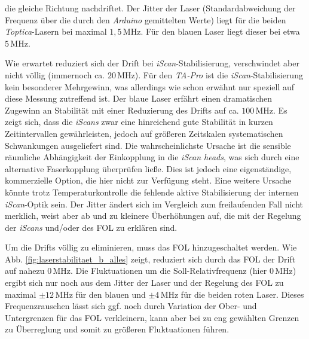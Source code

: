 die gleiche Richtung nachdriftet. Der Jitter der Laser (Standardabweichung der
Frequenz über die durch den \textit{Arduino} gemittelten Werte) liegt für die
beiden \textit{Toptica}-Lasern bei maximal $1,5\,$MHz. Für den blauen Laser
liegt dieser bei etwa $5\,$MHz.\par
Wie erwartet reduziert sich der Drift bei \textit{iScan}-Stabilisierung,
verschwindet aber nicht völlig (immernoch ca. $20\,$MHz). Für den \textit{TA-Pro} ist die
\textit{iScan}-Stabilisierung kein besonderer Mehrgewinn, was allerdings wie
schon erwähnt nur speziell auf diese Messung zutreffend ist. Der blaue Laser
erfährt einen dramatischen Zugewinn an Stabilität mit einer Reduzierung des
Drifts auf ca. $100\,$MHz. Es zeigt sich, dass die \textit{iScans} zwar
eine hinreichend gute Stabilität in kurzen Zeitintervallen gewährleisten, jedoch
auf größeren Zeitskalen systematischen Schwankungen ausgeliefert sind. Die
wahrscheinlichste Ursache ist die sensible räumliche Abhängigkeit der
Einkopplung in die \textit{iScan heads}, was sich durch eine alternative
Faserkopplung überprüfen ließe. Dies ist jedoch eine eigenständige, kommerzielle
Option, die hier nicht zur Verfügung steht. Eine weitere Ursache könnte trotz
Temperaturkontrolle die fehlende aktive Stabilisierung der internen \textit{iScan}-Optik sein. Der Jitter ändert sich im Vergleich zum freilaufenden Fall nicht merklich,
weist aber ab und zu kleinere Überhöhungen auf, die mit der Regelung der
\textit{iScans} und/oder des FOL zu erklären sind.\par
Um die Drifts völlig zu eliminieren, muss das FOL hinzugeschaltet werden. Wie
Abb. \ref{fig:laserstabilitaet_b_alles} zeigt, reduziert sich
durch das FOL der Drift auf nahezu $0\,$MHz. Die Fluktuationen um die
Soll-Relativfrequenz (hier $0\,$MHz) ergibt sich nur noch aus dem Jitter der
Laser und der Regelung des FOL zu maximal $\pm12\,$MHz für den blauen und
$\pm4\,$MHz für die beiden roten Laser. Dieses Frequenzrauschen lässt sich ggf.
noch durch Variation der Ober- und Untergrenzen für das FOL verkleinern, kann
aber bei zu eng gewählten Grenzen zu Überreglung und somit zu größeren Fluktuationen führen.
